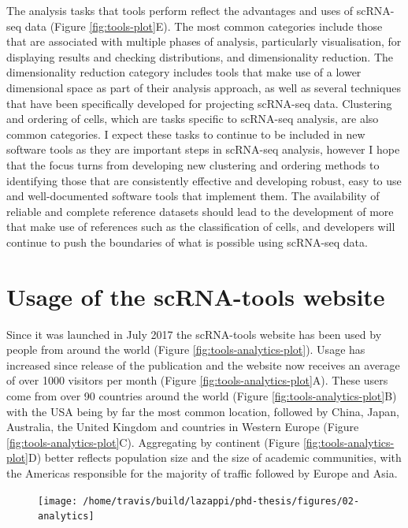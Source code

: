 \documentclass[11pt,a4paper,titlepage,twoside,openright]{style/unimelbthesis}
\theoremstyle{definition}
\theoremstyle{definition}
\theoremstyle{definition}
\theoremstyle{remark}
\begin{document}
\begin{mainmatter}
The analysis tasks that tools perform reflect the advantages and uses of scRNA-seq data (Figure \ref{fig:tools-plot}E). The most common categories include those that are associated with multiple phases of analysis, particularly visualisation, for displaying results and checking distributions, and dimensionality reduction. The dimensionality reduction category includes tools that make use of a lower dimensional space as part of their analysis approach, as well as several techniques that have been specifically developed for projecting scRNA-seq data. Clustering and ordering of cells, which are tasks specific to scRNA-seq analysis, are also common categories. I expect these tasks to continue to be included in new software tools as they are important steps in scRNA-seq analysis, however I hope that the focus turns from developing new clustering and ordering methods to identifying those that are consistently effective and developing robust, easy to use and well-documented software tools that implement them. The availability of reliable and complete reference datasets should lead to the development of more that make use of references such as the classification of cells, and developers will continue to push the boundaries of what is possible using scRNA-seq data.

\hypertarget{tools-usage}{%
\section{Usage of the scRNA-tools website}\label{tools-usage}}

Since it was launched in July 2017 the scRNA-tools website has been used by people from around the world (Figure \ref{fig:tools-analytics-plot}). Usage has increased since release of the publication and the website now receives an average of over 1000 visitors per month (Figure \ref{fig:tools-analytics-plot}A). These users come from over 90 countries around the world (Figure \ref{fig:tools-analytics-plot}B) with the USA being by far the most common location, followed by China, Japan, Australia, the United Kingdom and countries in Western Europe (Figure \ref{fig:tools-analytics-plot}C). Aggregating by continent (Figure \ref{fig:tools-analytics-plot}D) better reflects population size and the size of academic communities, with the Americas responsible for the majority of traffic followed by Europe and Asia.

\begin{figure}

{\centering \texttt{[image: /home/travis/build/lazappi/phd-thesis/figures/02-analytics]} 

}
\end{figure}
\end{mainmatter}
\end{document}
